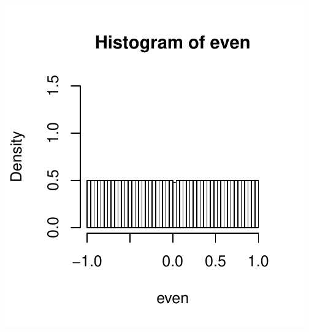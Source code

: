 \documentclass[12pt]{article}
\numberwithin{equation}{subsection}
\begin{document}
\begin{samepage}
\includegraphics[page=2]{dists.pdf}


\end{samepage}
\end{document}
